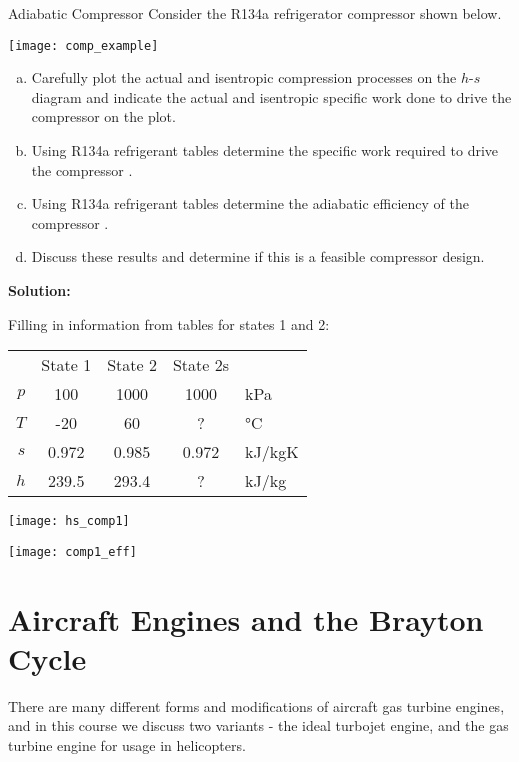 \begin{example}{Adiabatic Compressor}
  Consider the R134a refrigerator compressor shown below.
  \begin{center}
    \texttt{[image: comp\_example]}
  \end{center}

  \begin{enumerate}[a)]
  \item Carefully plot the actual and isentropic compression processes on the $h$-$s$ diagram and indicate the actual and isentropic specific work done to drive the compressor on the plot.
  \item Using R134a refrigerant tables determine the specific work required to drive the compressor \answer{[53.9 kJ/kg]}.
  \item Using R134a refrigerant tables determine the adiabatic efficiency of the compressor \answer{[$\eta_C$ = 92\%]}.
  \item Discuss these results and determine if this is a feasible compressor design.
  \end{enumerate}
  {\bf Solution:}

  Filling in information from tables for states 1 and 2:
  \begin{center}
    \def\arraystretch{1.5}
    \begin{tabular}{r|c|c|c|l}
       & State 1 & State 2 & State 2s & \\ \cline{2-4}
      $p$ & 100 & 1000 & 1000 & kPa \\ \cline{2-4}
      $T$ & -20 & 60 & ? & °C \\ \cline{2-4}
      $s$ & 0.972 & 0.985 & 0.972 & kJ/kgK \\ \cline{2-4}
      $h$ & 239.5 & 293.4 & ? & kJ/kg
    \end{tabular}
    \def\arraystretch{1.0}
  \end{center}
  
  \begin{center}
    \texttt{[image: hs\_comp1]}
  \end{center}
  
  \begin{center}
    \texttt{[image: comp1\_eff]}
  \end{center}
  
\end{example}

\section{Aircraft Engines and the Brayton Cycle}
There are many different forms and modifications of aircraft gas turbine engines, and in this course we discuss two variants - the ideal turbojet engine, and the gas turbine engine for usage in helicopters.

